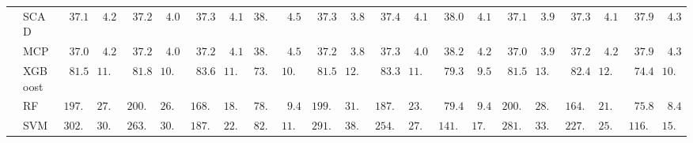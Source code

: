 \begin{tabular}{ll|ll|llllll|llllll|llllll}
 & SCAD  & $\phantom{0}37.18$ & $\phantom{0}4.23$ & $\phantom{0}37.24$ & $\phantom{0}4.07$ & $\phantom{0}37.30$ & $\phantom{0}4.19$ & $38.40$ & $\phantom{0}4.55$ & $\phantom{0}37.34$ & $\phantom{0}3.88$ & $\phantom{0}37.45$ & $\phantom{0}4.17$ & $\phantom{0}38.09$ & $\phantom{0}4.19$ & $\phantom{0}37.15$ & $\phantom{0}3.97$ & $\phantom{0}37.38$ & $\phantom{0}4.10$ & $\phantom{0}37.95$ & $\phantom{0}4.32$ \\
 & MCP  & $\phantom{0}37.07$ & $\phantom{0}4.21$ & $\phantom{0}37.20$ & $\phantom{0}4.09$ & $\phantom{0}37.23$ & $\phantom{0}4.15$ & $38.38$ & $\phantom{0}4.54$ & $\phantom{0}37.23$ & $\phantom{0}3.87$ & $\phantom{0}37.35$ & $\phantom{0}4.09$ & $\phantom{0}38.25$ & $\phantom{0}4.27$ & $\phantom{0}37.09$ & $\phantom{0}3.95$ & $\phantom{0}37.27$ & $\phantom{0}4.20$ & $\phantom{0}37.96$ & $\phantom{0}4.31$ \\
 & XGBoost  & $\phantom{0}81.50$ & $11.91$ & $\phantom{0}81.88$ & $10.71$ & $\phantom{0}83.66$ & $11.57$ & $73.85$ & $10.38$ & $\phantom{0}81.59$ & $12.06$ & $\phantom{0}83.32$ & $11.49$ & $\phantom{0}79.39$ & $\phantom{0}9.53$ & $\phantom{0}81.52$ & $13.48$ & $\phantom{0}82.41$ & $12.54$ & $\phantom{0}74.43$ & $10.21$ \\
 & RF  & $197.24$ & $27.79$ & $200.16$ & $26.69$ & $168.74$ & $18.86$ & $78.56$ & $\phantom{0}9.45$ & $199.18$ & $31.30$ & $187.66$ & $23.04$ & $\phantom{0}79.45$ & $\phantom{0}9.49$ & $200.43$ & $28.80$ & $164.34$ & $21.50$ & $\phantom{0}75.85$ & $\phantom{0}8.45$ \\
 & SVM  & $302.19$ & $30.36$ & $263.81$ & $30.37$ & $187.68$ & $22.31$ & $82.96$ & $11.89$ & $291.40$ & $38.02$ & $254.60$ & $27.34$ & $141.17$ & $17.27$ & $281.04$ & $33.10$ & $227.25$ & $25.80$ & $116.19$ & $15.89$ \\
\hline 
\end{tabular}


